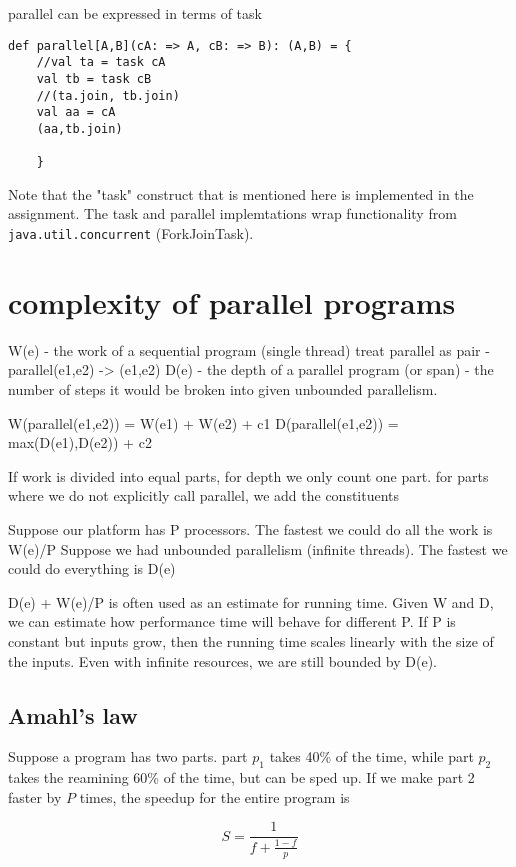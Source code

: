parallel can be expressed in terms of task
\begin{lstlisting}
def parallel[A,B](cA: => A, cB: => B): (A,B) = {
    //val ta = task cA
    val tb = task cB
    //(ta.join, tb.join)
    val aa = cA
    (aa,tb.join)

    }

\end{lstlisting}


Note that the "task" construct that is mentioned here is implemented in the assignment. The task and parallel implemtations wrap functionality from \lstinline|java.util.concurrent| (ForkJoinTask).

\section{complexity of parallel programs}
W(e) - the work of a sequential program (single thread)
treat parallel as pair - parallel(e1,e2) -> (e1,e2)
D(e) - the depth of a parallel program (or span) - the number of steps it would be broken into given unbounded parallelism.

W(parallel(e1,e2)) = W(e1) + W(e2) + c1
D(parallel(e1,e2)) = max(D(e1),D(e2)) + c2

If work is divided into equal parts, for depth we only count one part.
for parts where we do not explicitly call parallel, we add the constituents

Suppose our platform has P processors. The fastest we could do all the work is W(e)/P
Suppose we had unbounded parallelism (infinite threads). The fastest we could do everything is D(e)

D(e) + W(e)/P is often used as an estimate for running time. Given W and D, we can estimate how performance time will behave for different P. If P is constant but inputs grow, then the running time scales linearly with the size of the inputs.
Even with infinite resources, we are still bounded by D(e).

\subsection{Amahl's law}

Suppose a program has two parts. part $p_1$ takes 40\% of the time, while part $p_2$ takes the reamining 60\% of the time, but can be sped up. If we make part 2 faster by $P$ times, the speedup for the entire program is

\begin{equation}
S = \frac{1}{f + \frac{1-f}{p}}
\end{equation}

